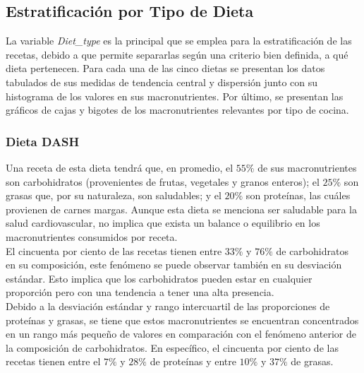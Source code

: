 \documentclass[12pt,a4paper]{article}
\begin{document}
    \subsection{Estratificación por Tipo de Dieta}

        La variable \emph{Diet\_type} es la principal que se emplea para la 
        estratificación de las recetas, debido a que permite separarlas 
        según una criterio bien definida, a qué dieta pertenecen. Para cada 
        una de las cinco dietas se presentan los datos tabulados de sus 
        medidas de tendencia central y dispersión junto con su histograma 
        de los valores en sus macronutrientes. Por último, se presentan las 
        gráficos de cajas y bigotes de los macronutrientes relevantes por 
        tipo de cocina. 

        \subsubsection{Dieta DASH}

            Una receta de esta dieta tendrá que, en promedio, el $55\%$ de sus 
            macronutrientes son carbohidratos (provenientes de frutas, vegetales 
            y granos enteros); el $25\%$ son grasas que, por su naturaleza, son 
            saludables; y el $20\%$ son proteínas, las cuáles provienen de carnes margas.
            Aunque esta dieta se menciona ser saludable para la salud cardiovascular, 
            no implica que exista un balance o equilibrio en los macronutrientes 
            consumidos por receta.\\

            El cincuenta por ciento de las recetas tienen entre $33\%$ y $76\%$ 
            de carbohidratos en su composición, este fenómeno se puede observar 
            también	en su desviación estándar. Esto implica que los carbohidratos 
            pueden estar en cualquier proporción pero con una tendencia a tener 
            una alta presencia.\\

            Debido a la desviación estándar y rango intercuartil de las proporciones 
            de proteínas y grasas, se tiene que estos macronutrientes se encuentran 
            concentrados en un rango más pequeño de valores en comparación con el 
            fenómeno anterior de la composición de carbohidratos. En específico, el 
            cincuenta por ciento de las recetas tienen entre el $7\%$ y $28\%$ de 
            proteínas y entre $10\%$ y $37\%$ de grasas.
\end{document}
